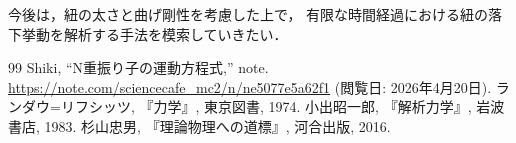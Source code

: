 \documentclass[11pt, a4paper]{ltjsarticle}
\begin{document}
今後は，紐の太さと曲げ剛性を考慮した上で，
有限な時間経過における紐の落下挙動を解析する手法を模索していきたい．

\begin{thebibliography}{99}
  Shiki, ``N重振り子の運動方程式,'' note. \url{https://note.com/sciencecafe_mc2/n/ne5077e5a62f1} (閲覧日: 2026年4月20日).
  ランダウ=リフシッツ, 『力学』, 東京図書, 1974.
  小出昭一郎, 『解析力学』, 岩波書店, 1983.
  杉山忠男, 『理論物理への道標』, 河合出版, 2016.
\end{thebibliography}
\end{document}
